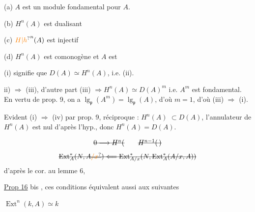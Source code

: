 (a) $A$ est un module fondamental pour $A$.

(b) $H^n(A)$ est dualisant

(c) ${\unsure{H|h}}^n(A)$ est injectif

(d) $H^n(A)$ est comonogène et $A$ est 

(i) signifie que $D(A)\simeq H^n(A)$, i.e. (ii).

ii) $\Rightarrow$ (iii), d'autre part (iii) $\Rightarrow H^n(A)\simeq D(A)^m$ i.e. $A^m$ est  fondamental. En vertu de prop. 9, on a $\lg_{\mathfrak p}(A^m)=\lg_{\mathfrak p}(A)$, d'où $m=1$, d'où (iii) $\Rightarrow$ (i). 

Evident (i) $\Rightarrow$ (iv) par prop. 9, réciproque : $H^n(A)$  $\subset D(A)$, l'annulateur de $H^n(A)$ est nul d'après l'hyp., donc $H^n(A)=D(A)$.



 

\[
 \deleted{0\longrightarrow H^{n}(}\qquad \deleted{H^{n-1}(\,)}
\]
\[
 \deleted{\operatorname{Ext}_{A}^{*}(N,A\deleted{\unsure{/x}})\Longleftarrow
 \operatorname{Ext}_{A/x}^{*}(N,\operatorname{Ext}_{A}^{*}(A/x,A))}
\]
 d'après le cor. au lemme 6,

\uline{Prop 16} bis , ces conditions équivalent aussi aux suivantes

   

  $\operatorname{Ext}^{n}(k,A)\simeq k$

